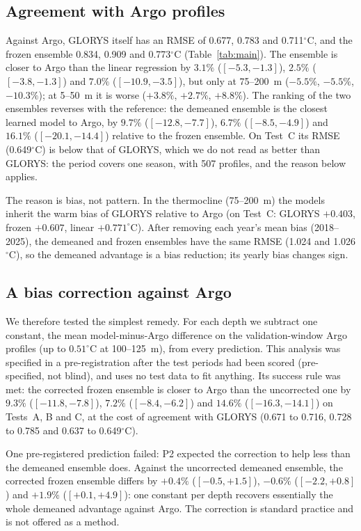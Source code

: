 \subsection{Agreement with Argo profiles}
Against Argo, GLORYS itself has an RMSE of 0.677, 0.783 and 0.711$^\circ$C, and the frozen ensemble 0.834, 0.909 and 0.773$^\circ$C (Table~\ref{tab:main}). The ensemble is closer to Argo than the linear regression by $3.1\%$ ($[-5.3,-1.3]$), $2.5\%$ ($[-3.8,-1.3]$) and $7.0\%$ ($[-10.9,-3.5]$), but only at 75--200~m ($-5.5\%$, $-5.5\%$, $-10.3\%$); at 5--50~m it is worse ($+3.8\%$, $+2.7\%$, $+8.8\%$). The ranking of the two ensembles reverses with the reference: the demeaned ensemble is the closest learned model to Argo, by $9.7\%$ ($[-12.8,-7.7]$), $6.7\%$ ($[-8.5,-4.9]$) and $16.1\%$ ($[-20.1,-14.4]$) relative to the frozen ensemble. On Test~C its RMSE (0.649$^\circ$C) is below that of GLORYS, which we do not read as better than GLORYS: the period covers one season, with 507 profiles, and the reason below applies.

The reason is bias, not pattern. In the thermocline (75--200~m) the models inherit the warm bias of GLORYS relative to Argo (on Test~C: GLORYS $+0.403$, frozen $+0.607$, linear $+0.771^\circ$C). After removing each year's mean bias (2018--2025), the demeaned and frozen ensembles have the same RMSE (1.024 and 1.026$^\circ$C), so the demeaned advantage is a bias reduction; its yearly bias changes sign.

\subsection{A bias correction against Argo}
We therefore tested the simplest remedy. For each depth we subtract one constant, the mean model-minus-Argo difference on the validation-window Argo profiles (up to $0.51^\circ$C at 100--125~m), from every prediction. This analysis was specified in a pre-registration after the test periods had been scored (pre-specified, not blind), and uses no test data to fit anything. Its success rule was met: the corrected frozen ensemble is closer to Argo than the uncorrected one by $9.3\%$ ($[-11.8,-7.8]$), $7.2\%$ ($[-8.4,-6.2]$) and $14.6\%$ ($[-16.3,-14.1]$) on Tests~A, B and C, at the cost of agreement with GLORYS (0.671 to 0.716, 0.728 to 0.785 and 0.637 to 0.649$^\circ$C).

One pre-registered prediction failed: P2 expected the correction to help less than the demeaned ensemble does. Against the uncorrected demeaned ensemble, the corrected frozen ensemble differs by $+0.4\%$ ($[-0.5,+1.5]$), $-0.6\%$ ($[-2.2,+0.8]$) and $+1.9\%$ ($[+0.1,+4.9]$): one constant per depth recovers essentially the whole demeaned advantage against Argo. The correction is standard practice and is not offered as a method.

